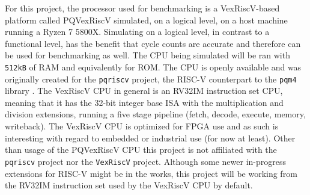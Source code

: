 For this project, the processor used for benchmarking is a VexRiscV-based platform called PQVexRiscV simulated, on a logical level, on a host machine running a Ryzen 7 5800X. Simulating on a logical level, in contrast to a functional level, has the benefit that cycle counts are accurate and therefore can be used for benchmarking as well. The CPU being simulated will be ran with \texttt{512kB} of RAM and equivalently for ROM. The CPU is openly available and was originally created for the \texttt{pqriscv} project, the RISC-V counterpart to the \texttt{pqm4} library \cite{pqvex}. The VexRiscV CPU in general is an RV32IM instruction set CPU, meaning that it has the 32-bit integer base ISA with the multiplication and division extensions, running a five stage pipeline (fetch, decode, execute, memory, writeback). The VexRiscV CPU is optimized for FPGA use \cite{vexriscv} and as such is interesting with regard to embedded or industrial use (for now at least). Other than usage of the PQVexRiscV CPU this project is not affiliated with the \texttt{pqriscv} project nor the \texttt{VexRiscV} project. Although some newer in-progress extensions for RISC-V might be in the works, this project will be working from the RV32IM instruction set used by the VexRiscV CPU by default.\medskip\\